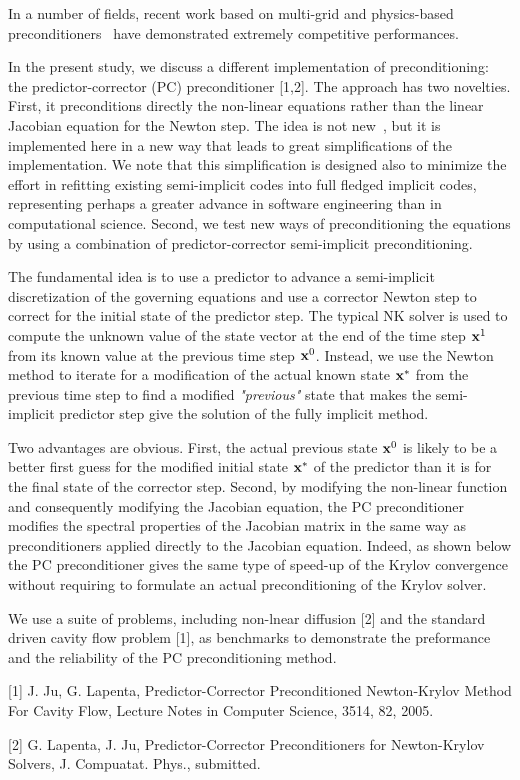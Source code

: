 \documentclass{report}
\begin{document}
In a number of fields, recent work based on multi-grid and
physics-based preconditioners~\cite{knoll} have demonstrated
extremely competitive performances.

In the present study, we discuss a different implementation of
preconditioning: the predictor-corrector (PC) preconditioner [1,2]. The
approach has two novelties. First, it preconditions directly the
non-linear equations rather than the linear Jacobian equation for
the Newton step. The idea is not new~\cite{kelley}, but it is
implemented here in a new way that leads to great simplifications of
the implementation. We note that this simplification is designed
also to minimize the effort in refitting existing semi-implicit
codes into full fledged implicit codes, representing perhaps a
greater advance in software engineering than in computational
science. Second, we test new ways of preconditioning the equations
by using a combination of predictor-corrector semi-implicit
preconditioning.

The fundamental idea is to use a predictor to advance a
semi-implicit discretization of the governing equations and use a
corrector Newton step to correct for the initial state of the
predictor step. The typical NK solver is used to compute the unknown
value of the state vector at the end of the time step ${\bf x}^{1}$
from its known value at the previous time step ${\bf x}^0$. Instead,
we use the Newton method to iterate for a modification of the actual
known state $ {\bf x}^{*}$ from the previous time step to find a
modified {\it "previous"} state that makes the semi-implicit
predictor step give the solution of the fully implicit method.

Two advantages are obvious. First, the actual previous state ${\bf
x}^0$ is likely to be a better first guess for the modified initial
state $ {\bf x}^{*}$ of the predictor than it is for the final
state of the corrector step. Second, by modifying the non-linear
function and consequently modifying the Jacobian equation, the PC
preconditioner modifies the spectral properties of the Jacobian
matrix in the same way as preconditioners applied directly to the
Jacobian equation. Indeed, as shown below the PC preconditioner
gives the same type of speed-up of the Krylov convergence without
requiring to formulate an actual preconditioning of the Krylov
solver.

We use a suite of problems, including non-lnear diffusion [2] and the
standard driven cavity flow problem [1], as benchmarks to demonstrate the
preformance and the reliability of the PC preconditioning method.

[1] J. Ju, G. Lapenta, Predictor-Corrector Preconditioned Newton-Krylov
Method For Cavity Flow, Lecture Notes in Computer Science, 3514, 82,
2005.

[2] G. Lapenta, J. Ju, Predictor-Corrector Preconditioners for
Newton-Krylov Solvers, J. Compuatat. Phys., submitted.
\end{document}

